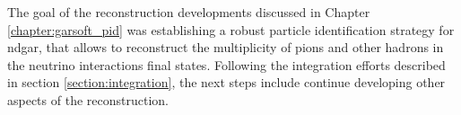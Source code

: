 \begin{comment}
Chapter \ref{chapter:garsoft_pid} reviews my work on the reconstruction for \gls{ndgar}. In section \ref{section:dEdx} I try to establish the relation between the measured charge in the readout and the deposited energy from a stopping proton sample, using the residual range of the tracks. This calibration allows to compute the mean $\mathrm{d}E/\mathrm{d}x$ for the particles. I finish the section providing a parametrisation for how this depends on the momentum. The problem of the muon and pion separation is the topic of section \ref{section:muon_bdt}. I propose to use the information from the \gls{ecal} to achieve this classification. In this section, I describe the features and the procedure I follow to train the classifier, showing its performance as a function of the particle momentum. In section \ref{section:tof} I explore the possibility of performing a \gls{tof} measurement with the \gls{ecal}. With this, I achieve a separation between pions and protons in a momentum range beyond the reach of the HPgTPC alone. Section \ref{section:pi_decay} is devoted to the identification of charged particle decays inside the HPgTPC where the parent plus (charged) daughter system is reconstructed as a single track. I use the information from the track fit to construct a series of variables which can identify the tracks containing decays, as well as locate their position. I finish the Chapter introducing a new clustering algorithm for the \gls{ecal} hits in section \ref{section:neutral}. It aims at having a one-to-one correspondence between particles and clusters, which will facilitate the reconstruction of neutral particles in the \gls{ecal}.

The goal of these developments was establishing a robust particle identification strategy for \gls{ndgar}, that allows to reconstruct the multiplicity of pions and other hadrons in the neutrino interactions final states. In section \ref{section:integration} I describe the status of the integration of the different additions to the reconstruction chain.
\end{comment}

The goal of the reconstruction developments discussed in Chapter \ref{chapter:garsoft_pid} was establishing a robust particle identification strategy for \gls{ndgar}, that allows to reconstruct the multiplicity of pions and other hadrons in the neutrino interactions final states. Following the integration efforts described in section \ref{section:integration}, the next steps include continue developing other aspects of the reconstruction.

